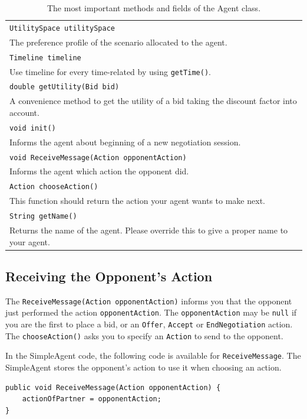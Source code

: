 \documentclass[]{article}
\begin{document}
\begin{table}[h]
\begin{tabular}{m{}}
\hline
\texttt{UtilitySpace utilitySpace}\\
The preference profile of the scenario allocated to the agent.\\
\hline
\texttt{Timeline timeline}\\
Use timeline for every time-related by using \texttt{getTime()}.\\
\hline
\texttt{double getUtility(Bid bid)}\\
A convenience method to get the utility of a bid taking the discount factor into account.\\
\hline
\texttt{void init()}\\
Informs the agent about beginning of a new negotiation session.\\
\hline
\texttt{void ReceiveMessage(Action opponentAction)}\\
Informs the agent which action the opponent did.\\
\hline
\texttt{Action chooseAction()}\\
This function should return the action your agent wants to make next.\\
\hline
\texttt{String getName()}\\
Returns the name of the agent. Please override this to give a proper name to your agent.\\
\hline
\end{tabular}
\caption{The most important methods and fields of the Agent class.}
\label{tab:agentclass}
\end{table}

\subsection{Receiving the Opponent's Action}
The \texttt{ReceiveMessage(Action opponentAction)} informs you that the opponent just performed the action \texttt{opponentAction}. The \texttt{opponentAction} may be  \texttt{null} if you are the first to place a bid, or an \texttt{Offer}, \texttt{Accept} or \texttt{EndNegotiation} action.
The \texttt{chooseAction()} asks you to specify an \texttt{Action} to send to the opponent.

In the SimpleAgent code, the following code is available for \texttt{ReceiveMessage}. The SimpleAgent stores the opponent's action to use it when choosing an action.

\begin{lstlisting}
public void ReceiveMessage(Action opponentAction) {
	actionOfPartner = opponentAction;
}
\end{lstlisting}
\end{document}
